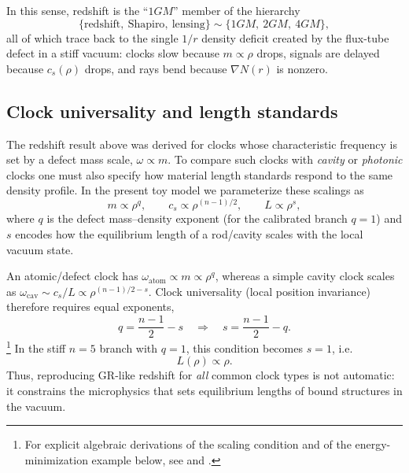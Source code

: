 \documentclass[11pt]{article}
\begin{document}
In this sense, redshift is the ``$1GM$'' member of the hierarchy
\[
  \{\text{redshift},\ \text{Shapiro},\ \text{lensing}\}
  \sim \{1GM,\ 2GM,\ 4GM\},
\]
all of which trace back to the single $1/r$ density deficit created by the
flux-tube defect in a stiff vacuum: clocks slow because $m\propto\rho$
drops, signals are delayed because $c_s(\rho)$ drops, and rays bend because
$\nabla N(r)$ is nonzero.


\subsection{Clock universality and length standards}
\label{subsec:redshift-universality}

The redshift result above was derived for clocks whose characteristic frequency
is set by a defect mass scale, $\omega\propto m$.
To compare such clocks with \emph{cavity} or \emph{photonic} clocks one must also
specify how material length standards respond to the same density profile.
In the present toy model we parameterize these scalings as
\begin{equation}
  m \propto \rho^{q},
  \qquad
  c_s \propto \rho^{(n-1)/2},
  \qquad
  L \propto \rho^{s},
\end{equation}
where $q$ is the defect mass--density exponent (for the calibrated branch
$q=1$) and $s$ encodes how the equilibrium length of a rod/cavity scales with
the local vacuum state.

An atomic/defect clock has $\omega_{\text{atom}}\propto m\propto\rho^{q}$,
whereas a simple cavity clock scales as
$\omega_{\text{cav}}\sim c_s/L\propto\rho^{(n-1)/2-s}$.
Clock universality (local position invariance) therefore requires equal
exponents,
\begin{equation}
  q = \frac{n-1}{2} - s
  \quad\Rightarrow\quad
  s = \frac{n-1}{2} - q.
  \label{eq:clock-universality-s}
\end{equation}\footnote{For explicit algebraic derivations of the scaling condition and of the energy-minimization example below, see  and .}
In the stiff $n=5$ branch with $q=1$, this condition becomes $s=1$, i.e.\
\begin{equation}
  L(\rho) \propto \rho.
  \label{eq:rod-scaling-n5}
\end{equation}
Thus, reproducing GR-like redshift for \emph{all} common clock types is not
automatic: it constrains the microphysics that sets equilibrium lengths of
bound structures in the vacuum.
\end{document}
